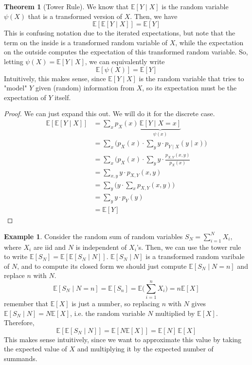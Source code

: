 \documentclass{article}
\theoremstyle{definition}
\newtheorem{theorem}{Theorem}[section]
\newtheorem{example}{Example}[section]
\theoremstyle{remark}
\theoremstyle{definition}
\begin{document}
\begin{theorem}[Tower Rule]
We know that $\mathbb{E}[Y \mid X]$ is the random variable $\psi(X)$ that is a transformed version of $X$. Then, we have
\[\mathbb{E}[ \mathbb{E}[Y \mid X]] = \mathbb{E}[Y]\]
This is confusing notation due to the iterated expectations, but note that the term on the inside is a transformed random variable of $X$, while the expectation on the outside computes the expectation of this transformed random variable. So, letting $\psi(X) = \mathbb{E}[Y \mid X]$, we can equivalently write 
\[\mathbb{E}[ \psi(X)] = \mathbb{E}[Y]\]
Intuitively, this makes sense, since $\mathbb{E}[Y \mid X]$ is the random variable that tries to "model" $Y$ given (random) information from $X$, so its expectation must be the expectation of $Y$ itself. 
\end{theorem}
\begin{proof}
We can just expand this out. We will do it for the discrete case. 
\begin{align*}
    \mathbb{E}[ \mathbb{E}[Y \mid X]] & = \sum_x p_X (x) \, \underbrace{\mathbb{E}[Y \mid X = x]}_{\psi(x)} \\
    & = \sum_x \bigg( p_X (x) \cdot \sum_y y \cdot p_{Y \mid X} (y \mid x) \bigg) \\
    & = \sum_x \bigg( p_X (x) \cdot \sum_y y \cdot \frac{p_{X, Y} (x, y)}{p_X (x)} \\
    & = \sum_{x, y} y \cdot p_{X, Y} (x, y) \\
    & = \sum_y \bigg( y \cdot \sum_x p_{X, Y} (x, y) \bigg) \\
    & = \sum_y y \cdot p_Y (y) \\
    & = \mathbb{E}[Y]
\end{align*}
\end{proof}

\begin{example}
Consider the random sum of random variables $S_N = \sum_{i=1}^N X_i$, where $X_i$ are iid and $N$ is independent of $X_i$'s. Then, we can use the tower rule to write $\mathbb{E}[S_N] = \mathbb{E}[\mathbb{E}[S_N \mid N]]$. $\mathbb{E}[S_N \mid N]$ is a transformed random varibale of $N$, and to compute its closed form we should just compute $\mathbb{E}[S_N \mid N = n]$ and replace $n$ with $N$. 
\[\mathbb{E}[S_N \mid N = n] = \mathbb{E}[S_n] = \mathbb{E} \bigg( \sum_{i=1}^n X_i \bigg) = n \mathbb{E}[X]\]
remember that $\mathbb{E}[X]$ is just a number, so replacing $n$ with $N$ gives $\mathbb{E}[S_N \mid N] = N \mathbb{E}[X]$, i.e. the random variable $N$ multiplied by $\mathbb{E}[X]$. Therefore, 
\[\mathbb{E}[\mathbb{E}[S_N \mid N]] = \mathbb{E}[N \mathbb{E}[X]] = \mathbb{E}[N] \, \mathbb{E}[X]\]
This makes sense intuitively, since we want to approximate this value by taking the expected value of $X$ and multiplying it by the expected number of summands. 
\end{example}
\end{document}
